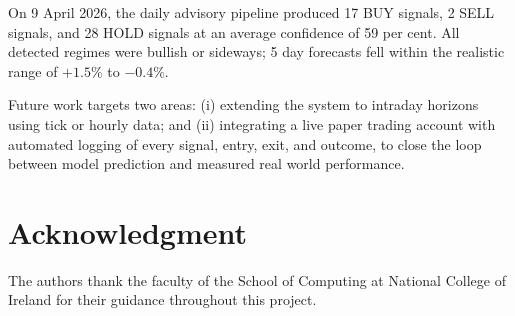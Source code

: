 \documentclass[journal]{IEEEtran}
\begin{document}
On 9 April 2026, the daily advisory pipeline produced 17 BUY signals,
2 SELL signals, and 28 HOLD signals at an average confidence of 59 per
cent. All detected regimes were bullish or sideways; 5 day forecasts fell
within the realistic range of $+1.5\%$ to $-0.4\%$.

Future work targets two areas: (i) extending the system to intraday
horizons using tick or hourly data; and (ii) integrating a live paper
trading account with automated logging of every signal, entry, exit, and
outcome, to close the loop between model prediction and measured real
world performance.

\section*{Acknowledgment}

The authors thank the faculty of the School of Computing at National
College of Ireland for their guidance throughout this project.

\ifCLASSOPTIONcaptionsoff
  \newpage
\fi
\end{document}
